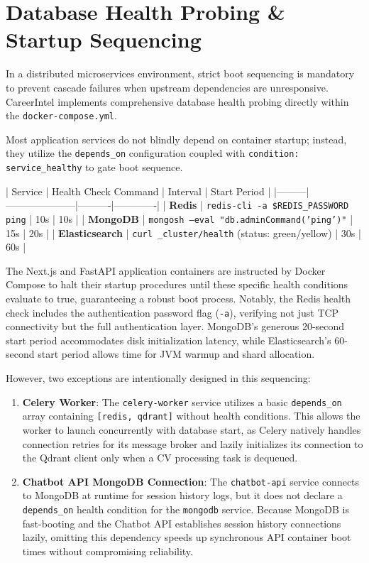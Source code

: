 \section{Database Health Probing \& Startup Sequencing}
In a distributed microservices environment, strict boot sequencing is mandatory to prevent cascade failures when upstream dependencies are unresponsive. CareerIntel implements comprehensive database health probing directly within the \texttt{docker-compose.yml}.

Most application services do not blindly depend on container startup; instead, they utilize the \texttt{depends\_on} configuration coupled with \texttt{condition: service\_healthy} to gate boot sequence.

| Service | Health Check Command | Interval | Start Period |
|---------|---------------------|----------|-------------|
| \textbf{Redis} | \texttt{redis-cli -a \${REDIS\_PASSWORD} ping} | 10s | 10s |
| \textbf{MongoDB} | \texttt{mongosh --eval "db.adminCommand('ping')"} | 15s | 20s |
| \textbf{Elasticsearch} | \texttt{curl \_cluster/health} (status: green/yellow) | 30s | 60s |

The Next.js and FastAPI application containers are instructed by Docker Compose to halt their startup procedures until these specific health conditions evaluate to true, guaranteeing a robust boot process. Notably, the Redis health check includes the authentication password flag (\texttt{-a}), verifying not just TCP connectivity but the full authentication layer. MongoDB's generous 20-second start period accommodates disk initialization latency, while Elasticsearch's 60-second start period allows time for JVM warmup and shard allocation.

However, two exceptions are intentionally designed in this sequencing:
\begin{enumerate}
\item \textbf{Celery Worker}: The \texttt{celery-worker} service utilizes a basic \texttt{depends\_on} array containing \texttt{[redis, qdrant]} without health conditions. This allows the worker to launch concurrently with database start, as Celery natively handles connection retries for its message broker and lazily initializes its connection to the Qdrant client only when a CV processing task is dequeued.
\item \textbf{Chatbot API MongoDB Connection}: The \texttt{chatbot-api} service connects to MongoDB at runtime for session history logs, but it does not declare a \texttt{depends\_on} health condition for the \texttt{mongodb} service. Because MongoDB is fast-booting and the Chatbot API establishes session history connections lazily, omitting this dependency speeds up synchronous API container boot times without compromising reliability.
\end{enumerate}

